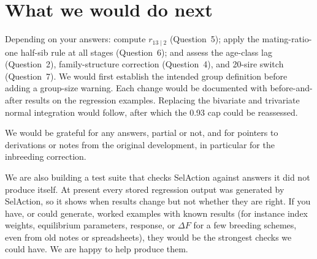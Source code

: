 \documentclass[11pt]{article}
\begin{document}
\section{What we would do next}
Depending on your answers: compute $r_{13\mid2}$ (Question~5); apply the mating-ratio-one half-sib rule at all stages (Question~6); and assess the age-class lag (Question~2), family-structure correction (Question~4), and 20-sire switch (Question~7). We would first establish the intended group definition before adding a group-size warning. Each change would be documented with before-and-after results on the regression examples. Replacing the bivariate and trivariate normal integration would follow, after which the 0.93 cap could be reassessed.

We would be grateful for any answers, partial or not, and for pointers to derivations or notes from the original development, in particular for the inbreeding correction.

We are also building a test suite that checks SelAction against answers it did not produce itself. At present every stored regression output was generated by SelAction, so it shows when results change but not whether they are right. If you have, or could generate, worked examples with known results (for instance index weights, equilibrium parameters, response, or $\Delta F$ for a few breeding schemes, even from old notes or spreadsheets), they would be the strongest checks we could have. We are happy to help produce them.
\end{document}
